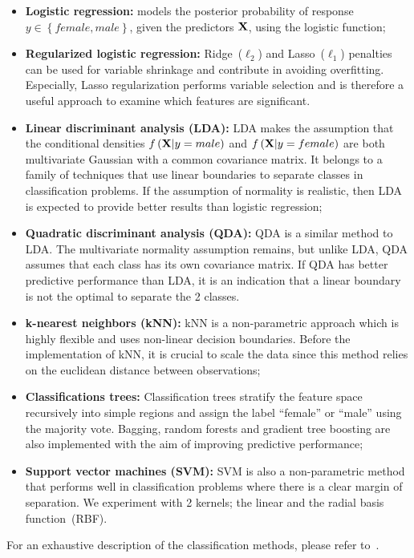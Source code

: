 \begin{itemize}
	\item \textbf{Logistic regression:} models the posterior probability of response $y\in \left\lbrace female, male \right\rbrace$, given the predictors $\mathbf{X}$, using the logistic function;
	
	\item \textbf{Regularized logistic regression:} Ridge~($\ell_2$) and Lasso~($\ell_1$) penalties can be used for variable shrinkage and contribute in avoiding overfitting. Especially, Lasso regularization performs variable selection and is therefore a useful approach to examine which features are significant.
	
	\item \textbf{Linear discriminant analysis (LDA):} LDA makes the assumption that the conditional densities $f \left(\mathbf{X}|y=male \right)$ and $ f \left(\mathbf{X}|y=female \right)$ are both multivariate Gaussian with a common covariance matrix. 
	It belongs to a family of techniques that use linear boundaries to separate classes in classification problems. 
	If the assumption of normality is realistic, then LDA is expected to provide better results than logistic regression;
	
	\item \textbf{Quadratic discriminant analysis (QDA):} QDA is a similar method to LDA. 
	The multivariate normality assumption remains, but unlike LDA, QDA assumes that each class has its own covariance matrix. 
	If QDA has better predictive performance than LDA, it is an indication that a linear boundary is not the optimal to separate the 2 classes.
	
	\item \textbf{k-nearest neighbors (kNN):} kNN is a non-parametric approach which is highly flexible and uses non-linear decision boundaries. 
	Before the implementation of kNN, it is crucial to scale the data since this method relies on the euclidean distance between observations;
	
	\item \textbf{Classifications trees:} Classification trees stratify the feature space recursively into simple regions and assign the label ``female'' or ``male'' using the majority vote. 
	Bagging, random forests and gradient tree boosting are also implemented with the aim of improving predictive performance;
	
	\item \textbf{Support vector machines (SVM):} SVM is also a non-parametric method that performs well in classification problems where there is a clear margin of separation. We experiment with \num{2} kernels; the linear and the radial basis function~(RBF).
\end{itemize}
For an exhaustive description of the classification methods, please refer to~\cite{ESL_2001}.
